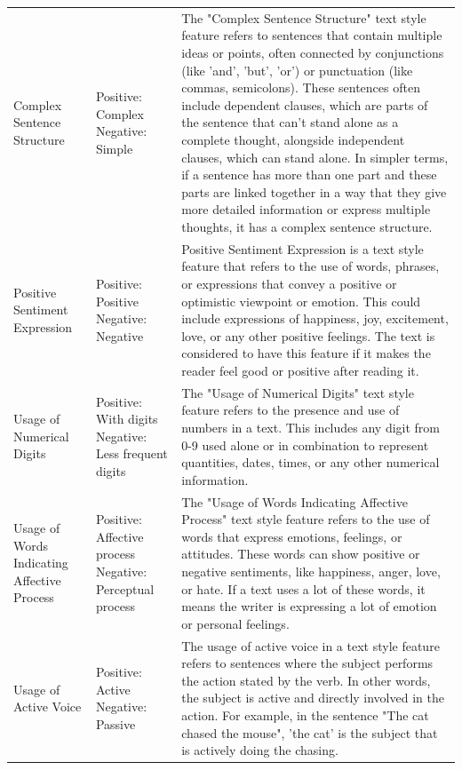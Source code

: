 {{\begin{longtable}{p{4cm} p{4cm} p{6.5cm}}
Complex Sentence Structure & Positive: Complex \newline Negative: Simple & The "Complex Sentence Structure" text style feature refers to sentences that contain multiple ideas or points, often connected by conjunctions (like 'and', 'but', 'or') or punctuation (like commas, semicolons). These sentences often include dependent clauses, which are parts of the sentence that can't stand alone as a complete thought, alongside independent clauses, which can stand alone. In simpler terms, if a sentence has more than one part and these parts are linked together in a way that they give more detailed information or express multiple thoughts, it has a complex sentence structure. \\
Positive Sentiment Expression & Positive: Positive \newline Negative: Negative & Positive Sentiment Expression is a text style feature that refers to the use of words, phrases, or expressions that convey a positive or optimistic viewpoint or emotion. This could include expressions of happiness, joy, excitement, love, or any other positive feelings. The text is considered to have this feature if it makes the reader feel good or positive after reading it. \\
Usage of Numerical Digits & Positive: With digits \newline Negative: Less frequent digits & The "Usage of Numerical Digits" text style feature refers to the presence and use of numbers in a text. This includes any digit from 0-9 used alone or in combination to represent quantities, dates, times, or any other numerical information. \\
Usage of Words Indicating Affective Process & Positive: Affective process \newline Negative: Perceptual process & The "Usage of Words Indicating Affective Process" text style feature refers to the use of words that express emotions, feelings, or attitudes. These words can show positive or negative sentiments, like happiness, anger, love, or hate. If a text uses a lot of these words, it means the writer is expressing a lot of emotion or personal feelings. \\
Usage of Active Voice & Positive: Active \newline Negative: Passive & The usage of active voice in a text style feature refers to sentences where the subject performs the action stated by the verb. In other words, the subject is active and directly involved in the action. For example, in the sentence "The cat chased the mouse", 'the cat' is the subject that is actively doing the chasing. \\

\end{longtable}}}
